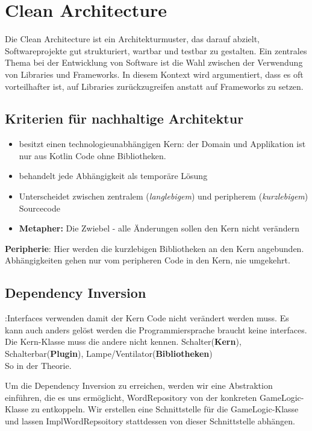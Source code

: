 \chapter{Clean Architecture}
Die Clean Architecture ist ein Architekturmuster, das darauf abzielt, Softwareprojekte gut strukturiert, wartbar und testbar zu gestalten. Ein zentrales Thema bei der Entwicklung von Software ist die Wahl zwischen der Verwendung von Libraries und Frameworks. In diesem Kontext wird argumentiert, dass es oft vorteilhafter ist, auf Libraries zurückzugreifen anstatt auf Frameworks zu setzen.\\

\section{Kriterien für nachhaltige Architektur}
\begin{itemize}
\item besitzt einen technologieunabhängigen Kern: der Domain und Applikation ist nur aus Kotlin Code ohne Bibliotheken.
\item behandelt jede Abhängigkeit als temporäre Lösung
\item Unterscheidet zwischen zentralem (\textit{langlebigem}) und peripherem (\textit{kurzlebigem}) Sourcecode
\item \textbf{Metapher:} Die Zwiebel - alle Änderungen sollen den Kern nicht verändern
\end{itemize}

\textbf{Peripherie}: Hier werden die kurzlebigen Bibliotheken an den Kern angebunden. Abhängigkeiten gehen nur vom peripheren Code in den Kern, nie umgekehrt.

\section{Dependency Inversion}
\label{sec:DI}
:Interfaces verwenden damit der Kern Code nicht verändert werden muss. Es kann auch anders gelöst werden die Programmiersprache braucht keine interfaces.
Die Kern-Klasse muss die andere nicht kennen. Schalter(\textbf{Kern}), Schalterbar(\textbf{Plugin}), Lampe/Ventilator(\textbf{Bibliotheken})\\
So in der Theorie.

Um die Dependency Inversion zu erreichen, werden wir eine Abstraktion einführen, die es uns ermöglicht, WordRepository von der konkreten GameLogic-Klasse zu entkoppeln. Wir erstellen eine Schnittstelle für die GameLogic-Klasse und lassen ImplWordRepsoitory stattdessen von dieser Schnittstelle abhängen.

